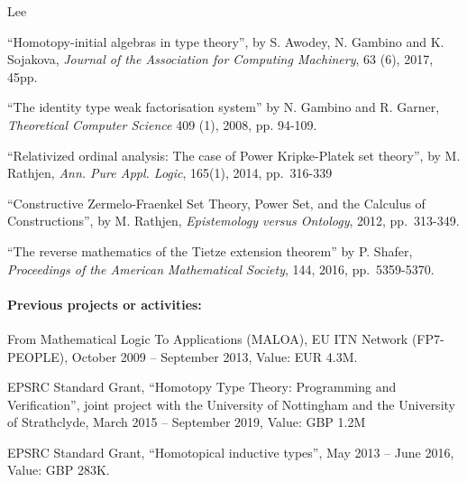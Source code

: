 \begin{sitedescription}{Lee}
\begin{compactitem}
\item ``Homotopy-initial algebras in type theory'', by S. Awodey, N. Gambino and K. Sojakova, 
{\em Journal of the Association for Computing Machinery}, 63 (6), 2017, 45pp.
\item ``The identity type weak factorisation system'' by N. Gambino and R. Garner, 
{\em Theoretical Computer Science} 409 (1), 2008, pp. 94-109.
\item ``Relativized ordinal analysis: The case of Power Kripke-Platek set theory'', by M. Rathjen, 
{\em Ann. Pure Appl. Logic}, 165(1), 2014, pp.~316-339 
\item ``Constructive Zermelo-Fraenkel Set Theory, Power Set, and the Calculus of Constructions'',
by M. Rathjen, {\em Epistemology versus Ontology}, 2012, pp.~313-349. 
\item ``The reverse mathematics of the Tietze extension theorem'' by P. Shafer,  
{\em Proceedings of the American Mathematical Society}, 144, 2016, pp.~5359-5370.
\end{compactitem}

\paragraph*{Previous projects or activities:}
 
\begin{compactitem}
\item From Mathematical Logic To Applications (MALOA), EU ITN Network (FP7-PEOPLE), October 2009 -- September 2013, Value: EUR 4.3M.
\item EPSRC Standard Grant, ``Homotopy Type Theory: Programming and Verification'', joint project with the University of Nottingham and the University of Strathclyde, March 2015 -- September 2019, Value: GBP 1.2M
\item EPSRC Standard Grant, ``Homotopical inductive types'', May 2013 -- June 2016, Value: GBP 283K.
\end{compactitem}

%


\end{sitedescription}
